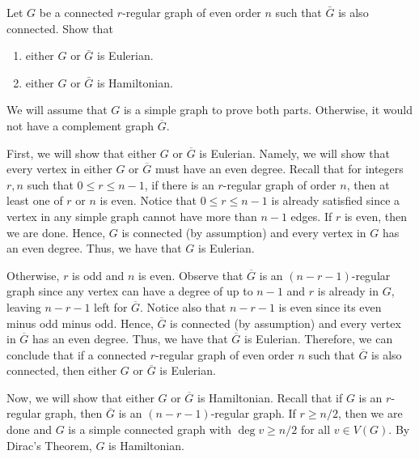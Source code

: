 \begin{hwproblem}{4}{
    Let $G$ be a connected $r$-regular graph of even order $n$ such that 
    $\bar{G}$ is also connected. Show that
    \begin{enumerate}[label=(\alph*)]
      \item either $G$ or $\bar{G}$ is Eulerian.
      \item either $G$ or $\bar{G}$ is Hamiltonian.
    \end{enumerate}
  }
  We will assume that \(G\) is a simple graph to prove both parts.
  Otherwise, it would not have a complement graph \(\overline{G}\).

  First, we will show that either \(G\) or \(\overline{G}\) is Eulerian. Namely,
  we will show that every vertex in either \(G\) or \(\overline{G}\) must have
  an even degree. Recall that for integers \(r, n\) such that \(0 \leq r \leq
  n-1\), if there is an \(r\)-regular graph of order \(n\), then at least one of
  \(r\) or \(n\) is even. Notice that \(0 \leq r \leq n-1\) is already satisfied
  since a vertex in any simple graph cannot have more than \(n-1\) edges.
  If \(r\) is even, then we are done. Hence, \(G\) is connected (by
  assumption) and every vertex in \(G\) has an even degree. Thus, we have that
  \(G\) is Eulerian.

  Otherwise, \(r\) is odd and \(n\) is even. Observe that 
  \(\overline{G}\) is an \((n-r-1)\)-regular graph since any vertex can have a
  degree of up to \(n-1\) and \(r\) is already in \(G\), leaving \(n-r-1\) left
  for \(\overline{G}\). Notice also that \(n-r-1\) is even since its even minus
  odd minus odd. Hence, \(\overline{G}\) is connected (by assumption) and 
  every vertex in \(\overline{G}\) has an even degree. Thus, we have that
  \(\overline{G}\) is Eulerian. Therefore, we can conclude that if a connected
  \(r\)-regular graph of even order \(n\) such that \(\overline{G}\) is also
  connected, then either \(G\) or \(\overline{G}\) is Eulerian.

  Now, we will show that either \(G\) or \(\overline{G}\) is Hamiltonian.
  Recall that if \(G\) is an \(r\)-regular graph, then \(\overline{G}\) is an
  \((n-r-1)\)-regular graph. If \(r \geq n/2\), then we are done and \(G\) is
  a simple connected graph with \(\deg v \geq n/2\) for all \(v \in V(G)\). By
  Dirac's Theorem, \(G\) is Hamiltonian.


\end{hwproblem}
